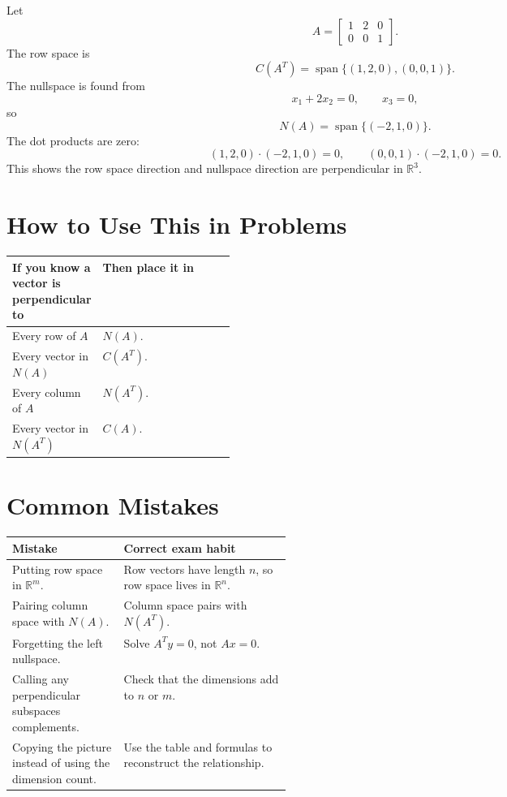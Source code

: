 \documentclass[10pt]{article}
\begin{document}
Let
\[
A=
\begin{bmatrix}
1&2&0\\
0&0&1
\end{bmatrix}.
\]
The row space is
\[
C(A^{T})=\operatorname{span}\{(1,2,0),(0,0,1)\}.
\]
The nullspace is found from
\[
x_1+2x_2=0,
\qquad
x_3=0,
\]
so
\[
N(A)=\operatorname{span}\{(-2,1,0)\}.
\]
The dot products are zero:
\[
(1,2,0)\cdot(-2,1,0)=0,
\qquad
(0,0,1)\cdot(-2,1,0)=0.
\]
This shows the row space direction and nullspace direction are perpendicular in \(\mathbb{R}^3\).

\section{How to Use This in Problems}

\begin{center}
\small
\begin{tabularx}{\linewidth}{@{}L{0.32\linewidth}Y@{}}
\toprule
If you know a vector is perpendicular to & Then place it in \\
\midrule
Every row of \(A\) & \(N(A)\). \\
Every vector in \(N(A)\) & \(C(A^{T})\). \\
Every column of \(A\) & \(N(A^{T})\). \\
Every vector in \(N(A^{T})\) & \(C(A)\). \\
\bottomrule
\end{tabularx}
\end{center}


\section{Common Mistakes}

\begin{center}
\small
\begin{tabularx}{\linewidth}{@{}L{0.40\linewidth}Y@{}}
\toprule
Mistake & Correct exam habit \\
\midrule
Putting row space in \(\mathbb{R}^m\). & Row vectors have length \(n\), so row space lives in \(\mathbb{R}^n\). \\
Pairing column space with \(N(A)\). & Column space pairs with \(N(A^{T})\). \\
Forgetting the left nullspace. & Solve \(A^{T}y=0\), not \(Ax=0\). \\
Calling any perpendicular subspaces complements. & Check that the dimensions add to \(n\) or \(m\). \\
Copying the picture instead of using the dimension count. & Use the table and formulas to reconstruct the relationship. \\
\bottomrule
\end{tabularx}
\end{center}
\end{document}
